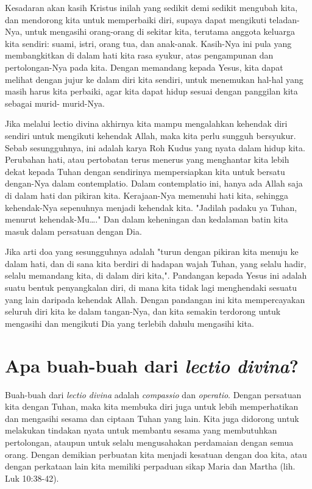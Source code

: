 Kesadaran akan kasih Kristus inilah yang sedikit demi sedikit mengubah kita, dan mendorong kita untuk memperbaiki diri, supaya dapat mengikuti teladan-Nya, untuk mengasihi orang-orang di sekitar kita, terutama anggota keluarga kita sendiri: suami, istri, orang tua, dan anak-anak. Kasih-Nya ini pula yang membangkitkan di dalam hati kita rasa syukur, atas pengampunan dan pertolongan-Nya pada kita. Dengan memandang kepada Yesus, kita dapat melihat dengan jujur ke dalam diri kita sendiri, untuk menemukan hal-hal yang masih harus kita perbaiki, agar kita dapat hidup sesuai dengan panggilan kita sebagai murid- murid-Nya.

Jika melalui lectio divina akhirnya kita mampu mengalahkan kehendak diri sendiri untuk mengikuti kehendak Allah, maka  kita perlu sungguh bersyukur. Sebab sesungguhnya, ini adalah karya Roh Kudus yang nyata dalam hidup kita. Perubahan hati, atau pertobatan terus menerus yang menghantar kita lebih dekat kepada Tuhan dengan sendirinya mempersiapkan kita untuk bersatu dengan-Nya dalam contemplatio. Dalam contemplatio ini, hanya ada Allah saja di dalam hati dan pikiran kita. Kerajaan-Nya memenuhi hati kita, sehingga kehendak-Nya sepenuhnya menjadi kehendak kita. "Jadilah padaku ya Tuhan, menurut kehendak-Mu…." Dan dalam keheningan dan kedalaman batin kita masuk dalam persatuan dengan Dia.

Jika arti doa yang sesungguhnya adalah "turun dengan pikiran kita menuju ke dalam hati, dan di sana kita berdiri di hadapan wajah Tuhan, yang selalu hadir, selalu memandang kita, di dalam diri kita,". Pandangan kepada Yesus ini adalah suatu bentuk penyangkalan diri, di mana kita tidak lagi menghendaki sesuatu yang lain daripada kehendak Allah. Dengan pandangan ini kita mempercayakan seluruh diri kita ke dalam tangan-Nya, dan kita semakin terdorong untuk mengasihi dan mengikuti Dia yang terlebih dahulu mengasihi kita.

\section{Apa buah-buah dari \textit{lectio divina}?}
Buah-buah dari \textit{lectio divina} adalah \textit{compassio} dan \textit{operatio}. Dengan persatuan kita dengan Tuhan, maka kita membuka diri juga untuk lebih memperhatikan dan mengasihi sesama dan ciptaan Tuhan yang lain. Kita juga didorong untuk melakukan tindakan nyata untuk membantu sesama yang membutuhkan pertolongan, ataupun untuk selalu mengusahakan perdamaian dengan semua orang. Dengan demikian perbuatan kita menjadi kesatuan dengan doa kita, atau dengan perkataan lain kita memiliki perpaduan sikap Maria dan Martha (lih. Luk 10:38-42).

